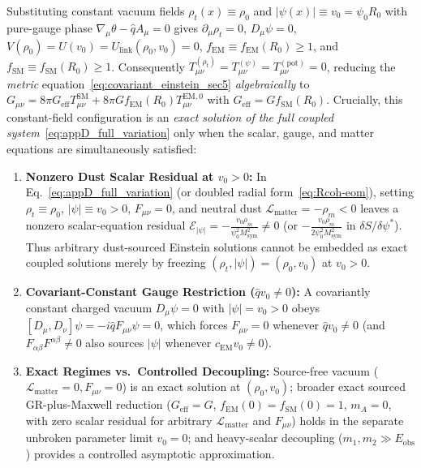 Substituting constant vacuum fields $\rho_t(x) \equiv \rho_0$ and $|\psi(x)| \equiv v_0 = \psi_0 R_0$ with pure-gauge phase $\nabla_\mu\theta - \hat{q}A_\mu = 0$ gives $\partial_\mu\rho_t = 0$, $D_\mu\psi = 0$, $V(\rho_0) = U(v_0) = U_{\mathrm{link}}(\rho_0, v_0) = 0$, $f_{\mathrm{EM}} \equiv f_{\mathrm{EM}}(R_0) \ge 1$, and $f_{\mathrm{SM}} \equiv f_{\mathrm{SM}}(R_0) \ge 1$. Consequently $T_{\mu\nu}^{(\rho_t)} = T_{\mu\nu}^{(\psi)} = T_{\mu\nu}^{(\mathrm{pot})} = 0$, reducing the \emph{metric} equation~\eqref{eq:covariant_einstein_sec5} \emph{algebraically} to $G_{\mu\nu} = 8\pi G_{\mathrm{eff}} T_{\mu\nu}^{\mathrm{SM}} + 8\pi G f_{\mathrm{EM}}(R_0) T_{\mu\nu}^{\mathrm{EM},0}$ with $G_{\mathrm{eff}} = G f_{\mathrm{SM}}(R_0)$. Crucially, this constant-field configuration is an \emph{exact solution of the full coupled system}~\eqref{eq:appD_full_variation} only when the scalar, gauge, and matter equations are simultaneously satisfied:
\begin{enumerate}[leftmargin=2em]
  \item \textbf{Nonzero Dust Scalar Residual at $v_0 > 0$:} In Eq.~\eqref{eq:appD_full_variation} (or doubled radial form~\eqref{eq:Rcoh-eom}), setting $\rho_t \equiv \rho_0$, $|\psi| \equiv v_0 > 0$, $F_{\mu\nu} = 0$, and neutral dust $\mathcal{L}_{\mathrm{matter}} = -\rho_m < 0$ leaves a nonzero scalar-equation residual $\mathcal{E}_{|\psi|} = -\frac{v_0\rho_m}{\psi_0^2 M_{\mathrm{sym}}^2} \ne 0$ (or $-\frac{v_0\rho_m}{2\psi_0^2 M_{\mathrm{sym}}^2}$ in $\delta S/\delta\psi^*$). Thus arbitrary dust-sourced Einstein solutions cannot be embedded as exact coupled solutions merely by freezing $(\rho_t, |\psi|) = (\rho_0, v_0)$ at $v_0 > 0$.
  \item \textbf{Covariant-Constant Gauge Restriction ($\hat{q}v_0 \ne 0$):} A covariantly constant charged vacuum $D_\mu\psi = 0$ with $|\psi| = v_0 > 0$ obeys $[D_\mu, D_\nu]\psi = -i\hat{q}F_{\mu\nu}\psi = 0$, which forces $F_{\mu\nu} = 0$ whenever $\hat{q}v_0 \ne 0$ (and $F_{\alpha\beta}F^{\alpha\beta} \ne 0$ also sources $|\psi|$ whenever $c_{\mathrm{EM}} v_0 \ne 0$).
  \item \textbf{Exact Regimes vs.\ Controlled Decoupling:} Source-free vacuum ($\mathcal{L}_{\mathrm{matter}} = 0, F_{\mu\nu} = 0$) is an exact solution at $(\rho_0, v_0)$; broader exact sourced GR-plus-Maxwell reduction ($G_{\mathrm{eff}} = G$, $f_{\mathrm{EM}}(0) = f_{\mathrm{SM}}(0) = 1$, $m_A = 0$, with zero scalar residual for arbitrary $\mathcal{L}_{\mathrm{matter}}$ and $F_{\mu\nu}$) holds in the separate unbroken parameter limit $v_0 = 0$; and heavy-scalar decoupling ($m_1, m_2 \gg E_{\mathrm{obs}}$) provides a controlled asymptotic approximation.
\end{enumerate}

